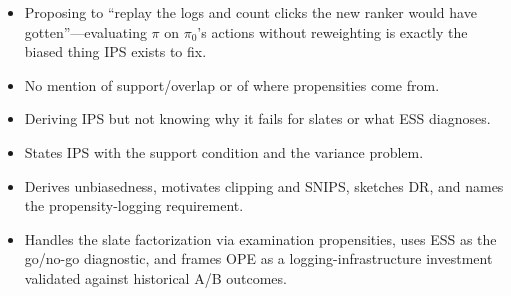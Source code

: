 \begin{interviewq}
\redflags
\begin{itemize}
    \item Proposing to ``replay the logs and count clicks the new ranker would have gotten''---evaluating $\pi$ on $\pi_0$'s actions without reweighting is exactly the biased thing IPS exists to fix.
    \item No mention of support/overlap or of where propensities come from.
    \item Deriving IPS but not knowing why it fails for slates or what ESS diagnoses.
\end{itemize}


\goodgreat
\begin{itemize}
    \item {} States IPS with the support condition and the variance problem.
    \item {} Derives unbiasedness, motivates clipping and SNIPS, sketches DR, and names the propensity-logging requirement.
    \item {} Handles the slate factorization via examination propensities, uses ESS as the go/no-go diagnostic, and frames OPE as a logging-infrastructure investment validated against historical A/B outcomes.
\end{itemize}

\end{interviewq}

